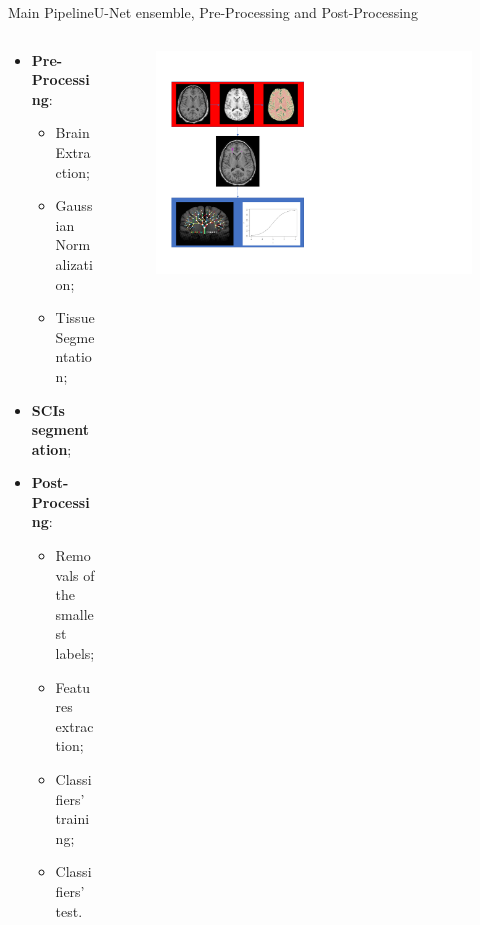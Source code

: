 \documentclass[]{standalone}
\begin{document}
	\begin{frame}{Main Pipeline}{U-Net ensemble, Pre-Processing and Post-Processing}
	\vspace{-20pt}
	
	\begin{columns}
		\begin{column}{0.45\textwidth}
			\begin{itemize}
				\item \textbf{Pre-Processing}:
					\begin{itemize}
						\small
						\item Brain Extraction;
					 	\item Gaussian Normalization;
					 	\item Tissue Segmentation;
				 	\end{itemize}
				 \item \textbf{SCIs segmentation};
				 \item \textbf{Post-Processing}:
				 	\begin{itemize}
				 		\footnotesize
					 	\item Removals of the smallest labels;
					 	\item Features extraction;
					 	\item Classifiers' training;
					 	\item Classifiers' test.
				 	\end{itemize}
			\end{itemize}
		\end{column}
	
		\begin{column}{0.55\textwidth}
			\centering
			\begin{figure}[h!]
				\includegraphics[scale=0.4]{./IMG/Flowchart_img.pdf}
			\end{figure}
		\end{column}
	\end{columns}
			
	\end{frame}
\end{document}
